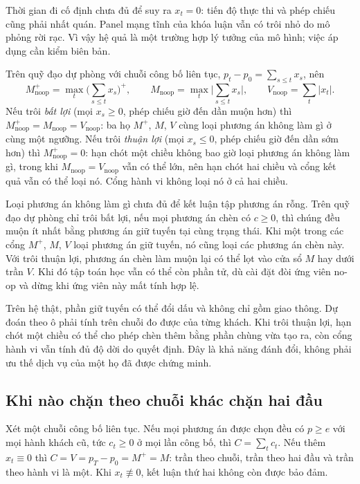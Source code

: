 Thời gian đi cố định chưa đủ để suy ra $x_t=0$: tiến độ thực thi và phép chiếu cũng phải
nhất quán. Panel mạng tĩnh của khóa luận vẫn có trôi nhỏ do mô phỏng rời rạc. Vì vậy hệ quả
là một trường hợp lý tưởng của mô hình; việc áp dụng cần kiểm biên bản.

\begin{hequa}
\label{hq:chieutroi}
Trên quỹ đạo dự phòng với chuỗi công bố liên tục, $p_t - p_0 = \sum_{s \le t} x_s$, nên
\[
M^{+}_{\text{noop}} = \max_t \Big(\sum_{s \le t} x_s\Big)^{+}, \qquad
M_{\text{noop}} = \max_t \Big|\sum_{s \le t} x_s\Big|, \qquad
V_{\text{noop}} = \sum_t |x_t| .
\]
Nếu trôi \emph{bất lợi} (mọi $x_s\ge0$, phép chiếu giờ đến dần muộn hơn) thì
$M^{+}_{\text{noop}} = M_{\text{noop}} = V_{\text{noop}}$: ba họ $M^{+}$, $M$, $V$ cùng loại phương
án không làm gì ở cùng một ngưỡng. Nếu trôi \emph{thuận lợi} (mọi $x_s\le0$, phép chiếu
giờ đến dần sớm hơn) thì
$M^{+}_{\text{noop}} = 0$: hạn chót một chiều không bao giờ loại phương án không làm gì, trong khi
$M_{\text{noop}} = V_{\text{noop}}$ vẫn có thể lớn, nên hạn chót hai chiều và cổng kết quả vẫn có
thể loại nó. Cổng hành vi không loại nó ở cả hai chiều.
\end{hequa}

Loại phương án không làm gì chưa đủ để kết luận tập phương án rỗng. Trên quỹ đạo dự phòng
chỉ trôi bất lợi, nếu mọi phương án chèn có $c\ge0$, thì chúng đều muộn ít nhất bằng
phương án giữ tuyến tại cùng trạng thái. Khi một trong các cổng $M^{+}$, $M$, $V$ loại
phương án giữ tuyến, nó cũng loại các phương án chèn này. Với trôi thuận lợi, phương án
chèn làm muộn lại có thể lọt vào cửa sổ $M$ hay dưới trần $V$. Khi đó tập toán học vẫn có
thể còn phần tử, dù cài đặt đòi ứng viên no-op và dừng khi ứng viên này mất tính hợp lệ.

Trên hệ thật, phần giữ tuyến có thể đổi dấu và không chỉ gồm giao thông. Dự đoán theo ô
phải tính trên chuỗi đo được của từng khách. Khi trôi thuận lợi, hạn chót một chiều có thể
cho phép chèn thêm bằng phần chùng vừa tạo ra, còn cổng hành vi vẫn tính đủ độ dời do quyết
định. Đây là khả năng đánh đổi, không phải ưu thế dịch vụ của một họ đã được chứng minh.

\subsection{Khi nào chặn theo chuỗi khác chặn hai đầu}


\begin{menhde}

Xét một chuỗi công bố liên tục. Nếu mọi phương án được chọn đều có $p \ge e$ với mọi hành khách
cũ, tức $c_t \ge 0$ ở mọi lần công bố, thì $C = \sum_t c_t$. Nếu thêm $x_t \equiv 0$ thì
$C = V = p_T - p_0 = M^{+} = M$: trần theo chuỗi, trần theo hai đầu và trần theo hành vi là một.
Khi $x_t \not\equiv 0$, kết luận thứ hai không còn được bảo đảm.
\end{menhde}

